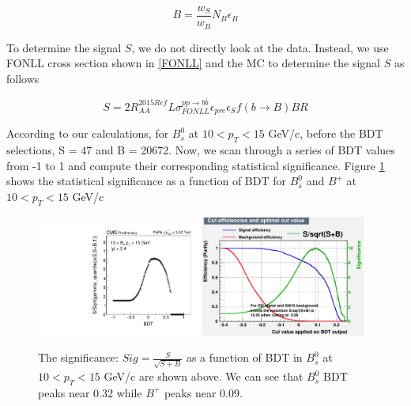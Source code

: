 \begin{equation}
B = \frac{w_{S}}{w_{B}} N_{B} \epsilon_{B}
\end{equation}

To determine the signal $S$, we do not directly look at the data. Instead, we use FONLL cross section \cite{FONLLRef} shown in \ref{FONLL} and the MC to determine the signal $S$ as follows

\begin{equation}
S = 2 R_{AA}^{2015Ref} L \sigma_{FONLL}^{pp\rightarrow b\bar b} \epsilon_{pre} \epsilon_{S} f(b\rightarrow B) BR
\end{equation}

According to our calculations, for $B^0_s$ at $10 < p_T < 15$ GeV/c, before the BDT selections, S = 47 and B = 20672. Now, we scan through a series of BDT values from -1 to 1 and compute their corresponding statistical significance. Figure \ref{WorkingPoint} shows the statistical significance as a function of BDT for $B^0_s$ and $B^+$ at $10 < p_T <  15$ GeV/c

\begin{figure}[h]
\begin{center}
\includegraphics[width= 0.48\textwidth]{Figures/Chapter5/BsSig_10_15.pdf}
\includegraphics[width= 0.48\textwidth]{Figures/Chapter5/BPSig_10_15.pdf}
\caption{The significance: $Sig = \frac{S}{\sqrt{S+B}}$ as a function of BDT in $B^0_s$ at $10 < p_T <  15$ GeV/c are shown above. We can see that $B^0_s$ BDT peaks near 0.32 while $B^+$ peaks near 0.09.}
\label{WorkingPoint}
\end{center}
\end{figure}

